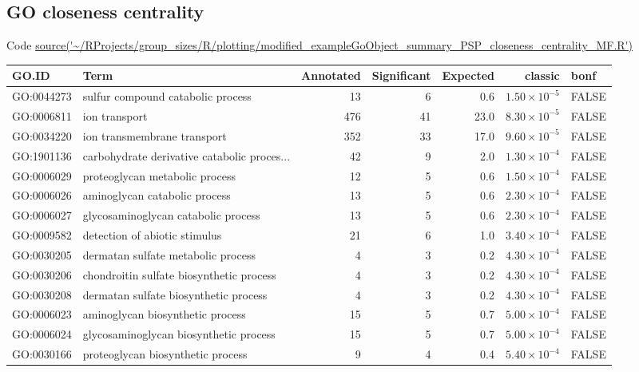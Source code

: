 \subsection{GO closeness centrality}
Code \url{source('~/RProjects/group_sizes/R/plotting/modified_exampleGoObject_summary_PSP_closeness_centrality_MF.R')}
\begin{table}[ht]
\centering
\begin{adjustbox}{max width=\textwidth}
\begin{tabular}{llrrrrl}
  \hline
GO.ID & Term & Annotated & Significant & Expected & classic & bonf \\ 
  \hline
GO:0044273 & sulfur compound catabolic process & 13 & 6 & 0.6 & $1.50 \times 10^{-5}$ & FALSE \\ 
  GO:0006811 & ion transport & 476 & 41 & 23.0 & $8.30 \times 10^{-5}$ & FALSE \\ 
  GO:0034220 & ion transmembrane transport & 352 & 33 & 17.0 & $9.60 \times 10^{-5}$ & FALSE \\ 
  GO:1901136 & carbohydrate derivative catabolic proces... & 42 & 9 & 2.0 & $1.30 \times 10^{-4}$ & FALSE \\ 
  GO:0006029 & proteoglycan metabolic process & 12 & 5 & 0.6 & $1.50 \times 10^{-4}$ & FALSE \\ 
  GO:0006026 & aminoglycan catabolic process & 13 & 5 & 0.6 & $2.30 \times 10^{-4}$ & FALSE \\ 
  GO:0006027 & glycosaminoglycan catabolic process & 13 & 5 & 0.6 & $2.30 \times 10^{-4}$ & FALSE \\ 
  GO:0009582 & detection of abiotic stimulus & 21 & 6 & 1.0 & $3.40 \times 10^{-4}$ & FALSE \\ 
  GO:0030205 & dermatan sulfate metabolic process & 4 & 3 & 0.2 & $4.30 \times 10^{-4}$ & FALSE \\ 
  GO:0030206 & chondroitin sulfate biosynthetic process & 4 & 3 & 0.2 & $4.30 \times 10^{-4}$ & FALSE \\ 
  GO:0030208 & dermatan sulfate biosynthetic process & 4 & 3 & 0.2 & $4.30 \times 10^{-4}$ & FALSE \\ 
  GO:0006023 & aminoglycan biosynthetic process & 15 & 5 & 0.7 & $5.00 \times 10^{-4}$ & FALSE \\ 
  GO:0006024 & glycosaminoglycan biosynthetic process & 15 & 5 & 0.7 & $5.00 \times 10^{-4}$ & FALSE \\ 
  GO:0030166 & proteoglycan biosynthetic process & 9 & 4 & 0.4 & $5.40 \times 10^{-4}$ & FALSE \\ 

\end{tabular}
\end{adjustbox}
\end{table}
